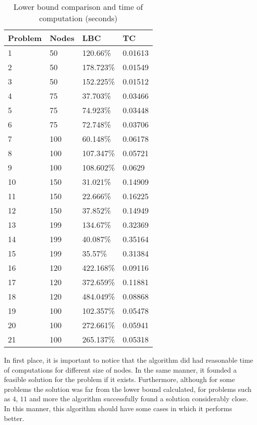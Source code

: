\documentclass[10pt,twoside]{article}
\begin{document}
\begin{table}[]
\centering
\begin{tabular}{llll}
\hline
Problem & Nodes & LBC       & TC      \\ \hline
1       & 50    & 120.66\%  & 0.01613 \\
2       & 50    & 178.723\% & 0.01549 \\
3       & 50    & 152.225\% & 0.01512 \\
4       & 75    & 37.703\%  & 0.03466 \\
5       & 75    & 74.923\%  & 0.03448 \\
6       & 75    & 72.748\%  & 0.03706 \\
7       & 100   & 60.148\%  & 0.06178 \\
8       & 100   & 107.347\% & 0.05721 \\
9       & 100   & 108.602\% & 0.0629  \\
10      & 150   & 31.021\%  & 0.14909 \\
11      & 150   & 22.666\%  & 0.16225 \\
12      & 150   & 37.852\%  & 0.14949 \\
13      & 199   & 134.67\%  & 0.32369 \\
14      & 199   & 40.087\%  & 0.35164 \\
15      & 199   & 35.57\%   & 0.31384 \\
16      & 120   & 422.168\% & 0.09116 \\
17      & 120   & 372.659\% & 0.11881 \\
18      & 120   & 484.049\% & 0.08868 \\
19      & 100   & 102.357\% & 0.05478 \\
20      & 100   & 272.661\% & 0.05941 \\
21      & 100   & 265.137\% & 0.05318 \\ \hline
\end{tabular}
\caption{Lower bound comparison and time of computation (seconds)}
\label{t_cp}
\end{table}

In first place, it is important to notice that the algorithm did had
reasonable time of computations for different size of nodes. In the
same manner, it founded a feasible solution for the problem if it
exists. Furthermore, although for some problems the solution was far
from the lower bound calculated, for problems such as $4$, $11$ and
more the algorithm successfully found a solution considerably
close. In this manner, this algorithm should have some cases in which
it performs better.
\end{document}
